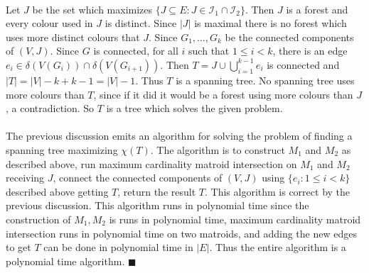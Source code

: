 \documentclass[letterpaper,12pt,oneside,onecolumn]{report}
\begin{document}
\paragraph{}
Let $J$ be the set which maximizes $\{J \subseteq E : J \in \mathcal{I}_1 \cap \mathcal{I}_2 \}$. Then $J$ is a forest and every colour used in $J$ is distinct. Since $|J|$ is maximal there is no forest which uses more distinct colours that $J$. Since $G_1, \dots, G_k$ be the connected components of $(V,J)$. Since $G$ is connected, for all $i$ such that $1\leq i < k$, there is an edge $e_i \in \delta(V(G_i)) \cap \delta(V(G_{i+1}))$. Then $T = J \cup \bigcup_{i=1}^{k-1} e_i$ is connected and $|T| = |V| - k + k-1 = |V| - 1$. Thus $T$ is a spanning tree. No spanning tree uses more colours than $T$, since if it did it would be a forest using more colours than $J$, a contradiction. So $T$ is a tree which solves the given problem.
\paragraph{}
The previous discussion emits an algorithm for solving the problem of finding a spanning tree maximizing $\chi(T)$. The algorithm is to construct $M_1$ and $M_2$ as described above, run maximum cardinality matroid intersection on $M_1$ and $M_2$ receiving $J$, connect the connected components of $(V,J)$ using $\{e_i : 1 \leq i < k\}$ described above getting $T$, return the result $T$. This algorithm is correct by the previous discussion. This algorithm runs in polynomial time since the construction of $M_1, M_2$ is runs in polynomial time, maximum cardinality matroid intersection runs in polynomial time on two matroids, and adding the new edges to get $T$ can be done in polynomial time in $|E|$. Thus the entire algorithm is a polynomial time algorithm. $\blacksquare$
\end{document}
